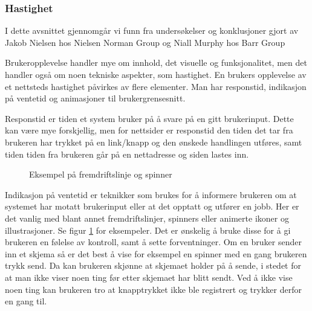 \subsubsection{Hastighet}
I dette avsnittet gjennomgår vi funn fra undersøkelser og konklusjoner gjort av Jakob Nielsen hos Nielsen Norman Group \cite{nngroupWebsiteResponseTimes} og Niall Murphy hos Barr Group \cite{barrgroupReponseTimingUI}


Brukeropplevelse handler mye om innhold, det visuelle og funksjonalitet, men det handler også om noen tekniske aspekter, som hastighet. En brukers opplevelse av et nettsteds hastighet påvirkes av flere elementer. Man har responstid, indikasjon på ventetid og animasjoner til brukergrensesnitt.

Responstid er tiden et system bruker på å svare på en gitt brukerinput.
Dette kan være mye forskjellig, men for nettsider er responstid den tiden det tar fra brukeren har trykket på en link/knapp og den ønskede handlingen utføres, samt tiden tiden fra brukeren går på en nettadresse og siden lastes inn.

\begin{figure}[H]
    \centering
    \caption{Eksempel på fremdriftslinje og spinner}
    \label{fig:analysis-loading-indicators}
\end{figure}

Indikasjon på ventetid er teknikker som brukes for å informere brukeren om at systemet har motatt brukerinput eller at det opptatt og utfører en jobb. Her er det vanlig med blant annet fremdriftslinjer, spinners eller animerte ikoner og illustrasjoner. Se figur \ref{fig:analysis-loading-indicators} for eksempeler.
Det er ønskelig å bruke disse for å gi brukeren en følelse av kontroll, samt å sette forventninger. Om en bruker sender inn et skjema så er det best å vise for eksempel en spinner med en gang brukeren trykk send. Da kan brukeren skjønne at skjemaet holder på å sende, i stedet for at man ikke viser noen ting før etter skjemaet har blitt sendt. Ved å ikke vise noen ting kan brukeren tro at knapptrykket ikke ble registrert og trykker derfor en gang til. 


